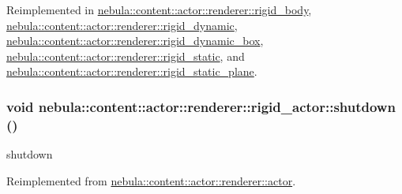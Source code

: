 Reimplemented in \hyperlink{classnebula_1_1content_1_1actor_1_1renderer_1_1rigid__body_ae3a3c72c7306b9ee55eb75abf36e7476}{nebula::content::actor::renderer::rigid\_\-body}, \hyperlink{classnebula_1_1content_1_1actor_1_1renderer_1_1rigid__dynamic_a80f2984c2dadef15360b53cf3d05286c}{nebula::content::actor::renderer::rigid\_\-dynamic}, \hyperlink{classnebula_1_1content_1_1actor_1_1renderer_1_1rigid__dynamic__box_af1ee2316e0a03674fbbaea64cf1c4a8b}{nebula::content::actor::renderer::rigid\_\-dynamic\_\-box}, \hyperlink{classnebula_1_1content_1_1actor_1_1renderer_1_1rigid__static_a37251ebb4a8c07abdff018bc8d1537fb}{nebula::content::actor::renderer::rigid\_\-static}, and \hyperlink{classnebula_1_1content_1_1actor_1_1renderer_1_1rigid__static__plane_a77394d3465965bdb4bc7aeb7a0290757}{nebula::content::actor::renderer::rigid\_\-static\_\-plane}.\hypertarget{classnebula_1_1content_1_1actor_1_1renderer_1_1rigid__actor_a9d1be32a4ba87de355247219e4e9f104}{
\subsubsection[{shutdown}]{\setlength{\rightskip}{0pt plus 5cm}void nebula::content::actor::renderer::rigid\_\-actor::shutdown ()}}
\label{classnebula_1_1content_1_1actor_1_1renderer_1_1rigid__actor_a9d1be32a4ba87de355247219e4e9f104}


shutdown 

Reimplemented from \hyperlink{classnebula_1_1content_1_1actor_1_1renderer_1_1actor_a3c051be72600dbc471e16e3c6ff53c52}{nebula::content::actor::renderer::actor}.

